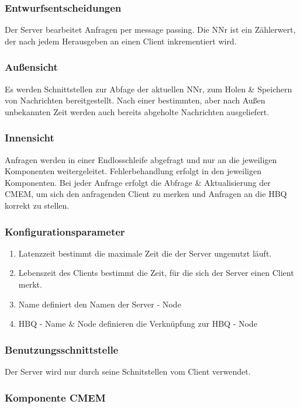 \documentclass{article}
\begin{document}
		\subsubsection{Entwurfsentscheidungen}
			Der Server bearbeitet Anfragen per message passing. Die NNr ist ein Zählerwert,
			der nach jedem Herausgeben an einen Client inkrementiert wird.
		\subsubsection{Außensicht}
			Es werden Schnittstellen zur Abfage der aktuellen NNr, zum Holen & Speichern 
			von Nachrichten bereitgestellt. Nach einer bestimmten, aber nach Außen unbekannten 
			Zeit werden auch bereits abgeholte Nachrichten ausgeliefert.
		\subsubsection{Innensicht}
			Anfragen werden in einer Endlosschleife abgefragt und nur an die jeweiligen 
			Komponenten weitergeleitet. Fehlerbehandlung erfolgt in den jeweiligen Komponenten.
			Bei jeder Anfrage erfolgt die Abfrage & Aktualisierung der CMEM,
			um sich den anfragenden Client zu merken und Anfragen an die HBQ korrekt zu stellen.
			
		\subsubsection{Konfigurationsparameter}
			\begin{enumerate}
    			\item{Latenzzeit bestimmt die maximale Zeit die der Server ungenutzt läuft.}
    			\item{Lebenszeit des Clients bestimmt die Zeit, für die sich der Server einen 
    					Client merkt.}
    			\item{Name definiert den Namen der Server - Node}
    			\item{HBQ - Name & Node definieren die Verknüpfung zur HBQ - Node}
    		\end{enumerate}
		\subsubsection{Benutzungsschnittstelle}
			Der Server wird nur durch seine Schnitstellen vom Client verwendet.
		\subsubsection{Komponente CMEM}
\end{document}
